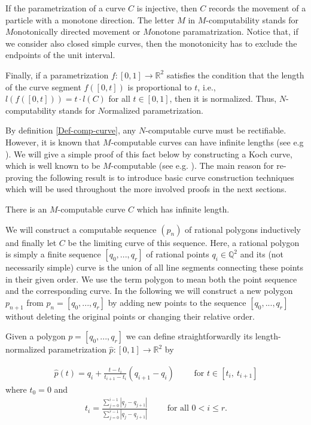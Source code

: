 \documentclass{LMCS}
\theoremstyle{plain}
\def\IQ{\mathbb{Q}}
\def\IR{\mathbb{R}}
\begin{document}
If the parametrization of a curve $C$ is injective, then $C$ records the movement of a particle with a monotone direction. The letter $M$ in $M$-computability stands for $M$onotonically  directed movement or $M$onotone paramatrization. Notice that, if we consider also closed simple curves, then the monotonicity has to exclude the endpoints of the unit interval.

Finally, if a parametrization $f:[0,1] \to \IR^2$ satisfies the condition that the length of the curve segment $f([0, t])$ is proportional to $t$, i.e., $l(f([0, t])) = t\cdot l(C)$ for all $t\in [0,1]$,  then it is  normalized. Thus, $N$-computability stands for $N$ormalized parametrization.

By definition \ref{Def-comp-curve}, any $N$-computable curve must be rectifiable. However, it is known that $M$-computable curves can have infinite lengths
(see e.g \cite{Ko98}). We will give a simple proof of this fact below by constructing a  Koch curve, which is well known to be $M$-computable (see e.g. \cite{Kam96}). The main reason for re-proving the following result is to introduce basic curve construction techniques which will be used throughout the more involved proofs in the next sections.

\begin{thm}\label{thm-inf-length-M-curve}
There is an $M$-computable curve $C$ which has infinite length.
\end{thm}

\proof
We will construct a computable sequence $(p_n)$ of rational polygons inductively and finally let $C$ be the limiting curve of this sequence. Here, a rational polygon is simply a finite sequence $[q_0,...,q_r]$ of rational points $q_i\in\IQ^2$ and its (not necessarily simple) curve is the union of all line segments connecting these points in their given order. We use the term polygon to mean both the point sequence and the corresponding curve. In the following we will construct a new polygon $p_{n+1}$ from $p_n= [q_0,...,q_r]$ by adding new points to the sequence $[q_0,...,q_r]$ without deleting the original points or changing their relative order.

Given a polygon $p=[q_0,...,q_r]$ we can define straightforwardly its length-normalized parametrization $\hat {p}: [0,1] \to \IR^2$ by

\begin{eqnarray*}
\hat{p}(t) = q_i + \frac{t-t_i}{t_{i+1} -t_i}(q_{i+1} -q_{i}) \qquad \mbox{ for } t \in [t_i ,\ t_{i+1}]
\end{eqnarray*}
where $t_0 =0$ and
\begin{eqnarray*}
t_i = \frac{\sum_{j=0}^{i-1} \left|q_j- q_{j+1}\right|}{\sum_{j=0}^{r-1} \left| q_j - q_{j+1}\right|} \qquad \mbox{ for all } 0 <i \le r.
\end{eqnarray*}
\end{document}
